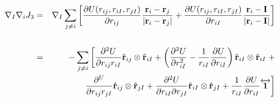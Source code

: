\begin{eqnarray}
\nabla_I \nabla_i J_3 & = & \nabla_I \sum_{j \neq i}
\left[\frac{\partial U(\rij, \riI,\rjI)}{\partial\rij}
  \frac{\mathbf{r}_i - \mathbf{r}_j}{|\mathbf{r}_i - \mathbf{r}_j|} 
+ \frac{\partial U(\rij, \riI,\rjI)}{\partial\riI}
  \frac{\mathbf{r}_i - \mathbf{I}}{|\mathbf{r}_i - \mathbf{I}|}  \right] \\\nonumber \\\nonumber
& = & -\sum_{j\neq i} \left[ 
\frac{\partial^2 U}{\partial \rij \riI} \hat{\mathbf{r}}_{ij} \otimes
\hat{\mathbf{r}}_{iI} + \left(\frac{\partial^2 U}{\partial \riI^2} -
\frac{1}{\riI} \frac{\partial U}{\partial \riI}\right)
\hat{\mathbf{r}}_{iI} \otimes \hat{\mathbf{r}}_{iI} \right. + \\\nonumber
& & \left. \qquad \ \ \  \frac{\partial^U}{\partial \rij \rjI} \hat{\mathbf{r}}_{ij} \otimes \hat{\mathbf{r}}_{jI} + \frac{\partial^2 U}{\partial \riI \partial \rjI}
\hat{\mathbf{r}}_{iI}\otimes \hat{\mathbf{r}}_{jI}  +
\frac{1}{\riI} \frac{\partial U}{\partial \riI} \overleftrightarrow{\mathbf{1}}\right]
\end{eqnarray}

